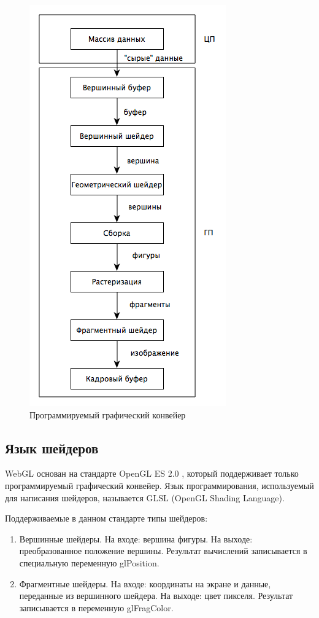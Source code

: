 \begin{figure}
\begin{center}
  \includegraphics[scale=1.0]{Figures/gpu_pipeline}
\end{center}
\caption{Программируемый графический конвейер}
\label{fig:gpu_pipeline}
\end{figure}


\subsection{Язык шейдеров}

WebGL основан на стандарте OpenGL ES 2.0 \cite{khr11}, который поддерживает только программируемый графический
конвейер. Язык программирования, используемый для написания шейдеров, называется GLSL (OpenGL
Shading Language).

Поддерживаемые в данном стандарте типы шейдеров:

\begin{enumerate}
  \item Вершинные шейдеры. На входе: вершина фигуры. На выходе: преобразованное положение
    вершины. Результат вычислений записывается в специальную переменную gl\textunderscore{}Position.
  \item Фрагментные шейдеры. На входе: координаты на экране и данные, переданные из вершинного 
    шейдера. На выходе: цвет пикселя. Результат записывается в переменную gl\textunderscore{}FragColor.
\end{enumerate}

